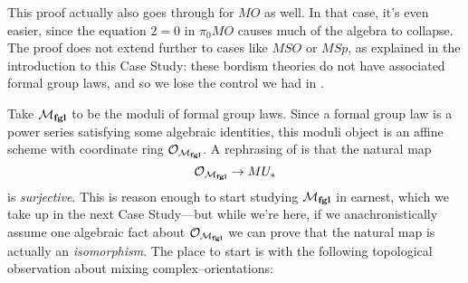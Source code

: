 \begin{remark}
This proof actually also goes through for $MO$ as well.  In that case, it's even easier, since the equation $2 = 0$ in $\pi_0 MO$ causes much of the algebra to collapse.  The proof does not extend further to cases like $MSO$ or $MSp$, as explained in the introduction to this Case Study: these bordism theories do not have associated formal group laws, and so we lose the control we had in .
\end{remark}

Take $\mathcal{M}_{\mathbf{fgl}}$ to be the moduli of formal group laws.  Since a formal group law is a power series satisfying some algebraic identities, this moduli object is an affine scheme with coordinate ring $\mathcal{O}_{\mathcal{M}_{\mathbf{fgl}}}$.  A rephrasing of  is that the natural map \[\mathcal{O}_{\mathcal{M}_{\mathbf{fgl}}} \to MU_*\] is \emph{surjective}.  This is reason enough to start studying $\mathcal{M}_{\mathbf{fgl}}$ in earnest, which we take up in the next Case Study---but while we're here, if we anachronistically assume one algebraic fact about $\mathcal{O}_{\mathcal{M}_{\mathbf{fgl}}}$ we can prove that the natural map is actually an \emph{isomorphism}.  The place to start is with the following topological observation about mixing complex--orientations:


